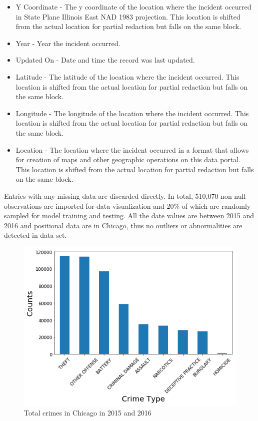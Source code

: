 \documentclass[12pt]{article}
\begin{document}
\begin{itemize}
\item Y Coordinate - The y coordinate of the location where the incident occurred in State Plane Illinois East NAD 1983 projection. This location is shifted from the actual location for partial redaction but falls on the same block.
\item Year - Year the incident occurred.
\item Updated On - Date and time the record was last updated.
\item Latitude - The latitude of the location where the incident occurred. This location is shifted from the actual location for partial redaction but falls on the same block.
\item Longitude - The longitude of the location where the incident occurred. This location is shifted from the actual location for partial redaction but falls on the same block.
\item Location - The location where the incident occurred in a format that allows for creation of maps and other geographic operations on this data portal. This location is shifted from the actual location for partial redaction but falls on the same block.
\end{itemize}

Entries with any missing data are discarded directly. In total, 510,070 non-null observations are imported for data visualization and 20\% of which are randomly sampled for model training and testing. All the date values are between 2015 and 2016 and positional data are in Chicago, thus no outliers or abnormalities are detected in data set.

\begin{figure}[ht]
\includegraphics[scale=0.5]{figure/total_crime.png}
\centering
\caption{Total crimes in Chicago in 2015 and 2016}
\label{fig:count}
\end{figure}
  
\end{document}
